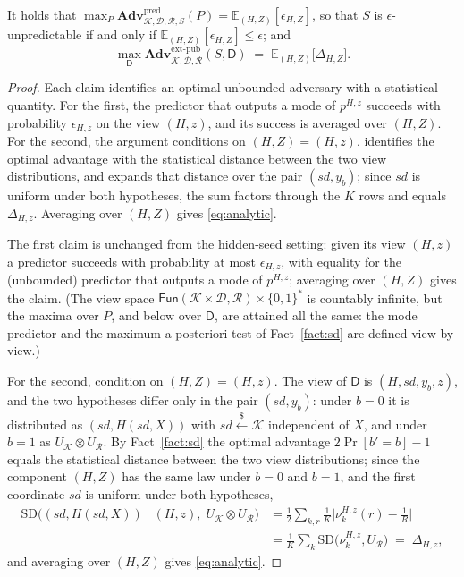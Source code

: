 \documentclass{conjura-solution}
\newcommand{\Fun}{\mathsf{Fun}}
\newcommand{\Adv}{\mathbf{Adv}}
\newcommand{\pred}{\mathrm{pred}}
\newcommand{\extp}{\mathrm{ext}\text{-}\mathrm{pub}}
\newcommand{\sd}{\mathit{sd}}
\renewcommand{\sample}{\stackrel{{\scriptscriptstyle\$}}{\leftarrow}}
\newcommand{\SD}{\mathrm{SD}}
\newcommand{\calK}{\mathcal{K}}
\newcommand{\calD}{\mathcal{D}}
\newcommand{\calR}{\mathcal{R}}
\begin{document}
\begin{lemma}\label{lem:analytic}
It holds that
$\max_{P} \Adv^{\pred}_{\calK,\calD,\calR,S}(P) = \mathbb{E}_{(H,Z)}[\epsilon_{H,Z}]$, so that
$S$ is $\epsilon$-unpredictable if and only if $\mathbb{E}_{(H,Z)}[\epsilon_{H,Z}] \le \epsilon$;
and
\begin{equation}\label{eq:analytic}
  \max_{\mathsf{D}}\Adv^{\extp}_{\calK,\calD,\calR}(S,\mathsf{D})
  \;=\; \mathbb{E}_{(H,Z)}\bigl[\Delta_{H,Z}\bigr] .
\end{equation}
\end{lemma}

\begin{proof}
Each claim identifies an optimal unbounded adversary with a statistical quantity. For the first,
the predictor that outputs a mode of $p^{H,z}$ succeeds with probability $\epsilon_{H,z}$ on the
view $(H,z)$, and its success is averaged over $(H,Z)$. For the second, the argument conditions on
$(H,Z) = (H,z)$, identifies the optimal advantage with the statistical distance between the two
view distributions, and expands that distance over the pair $(\sd,y_b)$; since $\sd$ is uniform
under both hypotheses, the sum factors through the $K$ rows and equals $\Delta_{H,z}$. Averaging
over $(H,Z)$ gives \eqref{eq:analytic}.

The first claim is unchanged from the hidden-seed setting: given its view $(H,z)$ a predictor
succeeds with probability at most $\epsilon_{H,z}$, with equality for the (unbounded) predictor
that outputs a mode of $p^{H,z}$; averaging over $(H,Z)$ gives the claim. (The view space
$\Fun(\calK \times \calD, \calR) \times \{0,1\}^{*}$ is countably infinite, but the maxima over
$P$, and below over $\mathsf{D}$, are attained all the same: the mode predictor and the
maximum-a-posteriori test of Fact~\ref{fact:sd} are defined view by view.)

For the second, condition on $(H,Z) = (H,z)$. The view of $\mathsf{D}$ is $(H, \sd, y_b, z)$, and
the two hypotheses differ only in the pair $(\sd, y_b)$: under $b = 0$ it is distributed as
$(\sd, H(\sd,X))$ with $\sd \sample \calK$ independent of $X$, and under $b = 1$ as
$U_{\calK} \otimes U_{\calR}$. By Fact~\ref{fact:sd} the optimal advantage $2\Pr[b'=b]-1$ equals the
statistical distance between the two view distributions; since the component $(H,Z)$ has the same
law under $b=0$ and $b=1$, and the first coordinate $\sd$ is uniform under both hypotheses,
\begin{align*}
  \SD\bigl((\sd, H(\sd,X)) \mid (H,z),\; U_{\calK}\otimes U_{\calR}\bigr)
  &= \tfrac12 \sum_{k,r} \tfrac1K \bigl|\nu^{H,z}_{k}(r) - \tfrac1R\bigr| \\
  &= \frac1K \sum_{k} \SD\bigl(\nu^{H,z}_{k}, U_{\calR}\bigr)
  \;=\; \Delta_{H,z},
\end{align*}
and averaging over $(H,Z)$ gives \eqref{eq:analytic}.
\end{proof}
\end{document}
